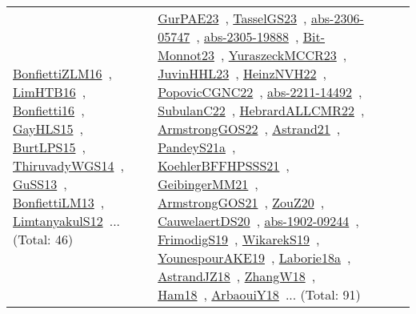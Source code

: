 {\begin{longtable}{lp{3cm}>{\raggedright\arraybackslash}p{6cm}>{\raggedright\arraybackslash}p{6cm}>{\raggedright\arraybackslash}p{8cm}}
\href{works/BonfiettiZLM16.pdf}{BonfiettiZLM16}~\cite{BonfiettiZLM16}, \href{works/LimHTB16.pdf}{LimHTB16}~\cite{LimHTB16}, \href{works/Bonfietti16.pdf}{Bonfietti16}~\cite{Bonfietti16}, \href{works/GayHLS15.pdf}{GayHLS15}~\cite{GayHLS15}, \href{works/BurtLPS15.pdf}{BurtLPS15}~\cite{BurtLPS15}, \href{works/ThiruvadyWGS14.pdf}{ThiruvadyWGS14}~\cite{ThiruvadyWGS14}, \href{works/GuSS13.pdf}{GuSS13}~\cite{GuSS13}, \href{works/BonfiettiLM13.pdf}{BonfiettiLM13}~\cite{BonfiettiLM13}, \href{works/LimtanyakulS12.pdf}{LimtanyakulS12}~\cite{LimtanyakulS12}... (Total: 46) & \href{works/GurPAE23.pdf}{GurPAE23}~\cite{GurPAE23}, \href{works/TasselGS23.pdf}{TasselGS23}~\cite{TasselGS23}, \href{works/abs-2306-05747.pdf}{abs-2306-05747}~\cite{abs-2306-05747}, \href{works/abs-2305-19888.pdf}{abs-2305-19888}~\cite{abs-2305-19888}, \href{works/Bit-Monnot23.pdf}{Bit-Monnot23}~\cite{Bit-Monnot23}, \href{works/YuraszeckMCCR23.pdf}{YuraszeckMCCR23}~\cite{YuraszeckMCCR23}, \href{works/JuvinHHL23.pdf}{JuvinHHL23}~\cite{JuvinHHL23}, \href{works/HeinzNVH22.pdf}{HeinzNVH22}~\cite{HeinzNVH22}, \href{works/PopovicCGNC22.pdf}{PopovicCGNC22}~\cite{PopovicCGNC22}, \href{works/abs-2211-14492.pdf}{abs-2211-14492}~\cite{abs-2211-14492}, \href{works/SubulanC22.pdf}{SubulanC22}~\cite{SubulanC22}, \href{works/HebrardALLCMR22.pdf}{HebrardALLCMR22}~\cite{HebrardALLCMR22}, \href{works/ArmstrongGOS22.pdf}{ArmstrongGOS22}~\cite{ArmstrongGOS22}, \href{works/Astrand21.pdf}{Astrand21}~\cite{Astrand21}, \href{works/PandeyS21a.pdf}{PandeyS21a}~\cite{PandeyS21a}, \href{works/KoehlerBFFHPSSS21.pdf}{KoehlerBFFHPSSS21}~\cite{KoehlerBFFHPSSS21}, \href{works/GeibingerMM21.pdf}{GeibingerMM21}~\cite{GeibingerMM21}, \href{works/ArmstrongGOS21.pdf}{ArmstrongGOS21}~\cite{ArmstrongGOS21}, \href{works/ZouZ20.pdf}{ZouZ20}~\cite{ZouZ20}, \href{works/CauwelaertDS20.pdf}{CauwelaertDS20}~\cite{CauwelaertDS20}, \href{works/abs-1902-09244.pdf}{abs-1902-09244}~\cite{abs-1902-09244}, \href{works/FrimodigS19.pdf}{FrimodigS19}~\cite{FrimodigS19}, \href{works/WikarekS19.pdf}{WikarekS19}~\cite{WikarekS19}, \href{works/YounespourAKE19.pdf}{YounespourAKE19}~\cite{YounespourAKE19}, \href{works/Laborie18a.pdf}{Laborie18a}~\cite{Laborie18a}, \href{works/AstrandJZ18.pdf}{AstrandJZ18}~\cite{AstrandJZ18}, \href{works/ZhangW18.pdf}{ZhangW18}~\cite{ZhangW18}, \href{works/Ham18.pdf}{Ham18}~\cite{Ham18}, \href{works/ArbaouiY18.pdf}{ArbaouiY18}~\cite{ArbaouiY18}... (Total: 91)\\

\end{longtable}}
